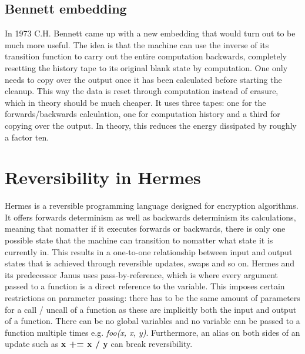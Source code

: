\subsection{Bennett embedding}
In 1973 C.H. Bennett came up with a new embedding that would turn out to be much more useful\cite{Bennett1973LogicalRO}.
The idea is that the machine can use the inverse of its transition function to carry out the entire computation backwards, completely resetting the history tape to its original blank state by computation. One only needs to copy over the output once it has been calculated before starting the cleanup. This way the data is reset through computation instead of erasure, which in theory should be much cheaper.
It uses three tapes: one for the forwards/backwards calculation, one for computation history and a third for copying over the output. 
In theory, this reduces the energy dissipated by roughly a factor ten.

\section{Reversibility in Hermes}
Hermes is a reversible programming language designed for encryption algorithms. It offers forwards determinism as well as backwards determinism its calculations, meaning that nomatter if it executes forwards or backwards,  there is only one possible state that the machine can transition to nomatter what state it is currently in.
This results in a one-to-one relationship between input and output states that is achieved through reversible updates, swaps and so on.
Hermes and its predecessor Janus uses pass-by-reference, which is where every argument passed to a function is a direct reference to the variable.
This imposes certain restrictions on parameter passing: there has to be the same amount of parameters for a call / uncall of a function as these are implicitly both the input and output of a function.
There can be no global variables and no variable can be passed to a function multiple times e.g. \emph{foo(x, x, y)}.
Furthermore, an alias on both sides of an update such as \textbf{x += x / y} can break reversibility.

